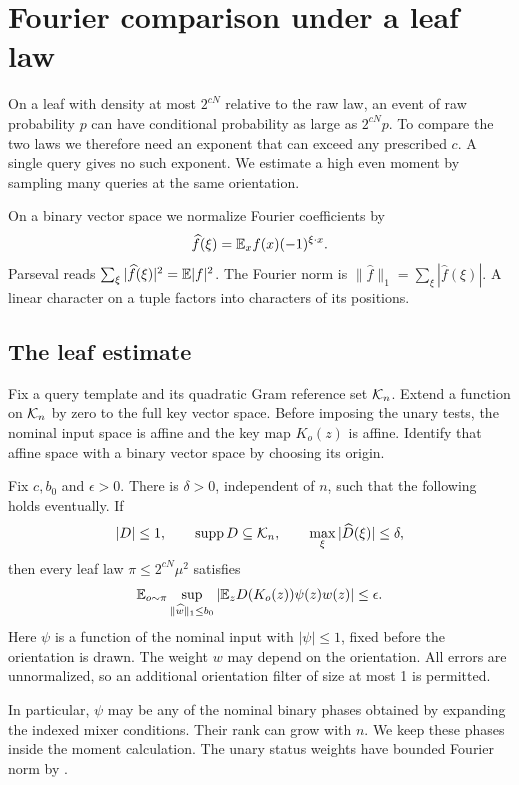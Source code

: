 \section{Fourier comparison under a leaf law}\label{sec:histograms}

On a leaf with density at most \(2^{cN}\) relative to the raw law,
an event of raw probability \(p\) can have conditional probability as
large as \(2^{cN}p\). To compare the two laws we therefore need an
exponent that can exceed any prescribed \(c\). A single query gives
no such exponent. We estimate a high even moment by sampling many
queries at the same orientation.

On a binary vector space we normalize Fourier coefficients by
\[
 \widehat f(\xi)=\mathbb E_x f(x)(-1)^{\xi\cdot x}.
\]
Parseval reads \(\sum_\xi|\widehat f(\xi)|^2=\mathbb E|f|^2\).
The Fourier norm is \(\|\widehat f\|_1=\sum_\xi|\widehat f(\xi)|\).
A linear character on a tuple factors into characters of its positions.

\subsection{The leaf estimate}

Fix a query template and its quadratic Gram reference set \(\mathcal K_n\).
Extend a function on \(\mathcal K_n\) by zero to the full key vector space.
Before imposing the unary tests, the nominal input space is affine and
the key map \(K_o(z)\) is affine. Identify that affine space with a binary
vector space by choosing its origin.

\begin{theorem}\label{thm:leaf-fourier}
Fix \(c,b_0\) and \(\epsilon>0\). There is \(\delta>0\), independent
of \(n\), such that the following holds eventually. If
\[
 |D|\le1,\qquad \operatorname{supp} D\subseteq\mathcal K_n,\qquad
 \max_\xi|\widehat D(\xi)|\le\delta,
\]
then every leaf law \(\pi\le2^{cN}\mu^2\) satisfies
\[
 \mathbb E_{o\sim\pi}\sup_{\|\widehat w\|_1\le b_0}
 \left|\mathbb E_zD(K_o(z))\psi(z)w(z)\right|\le\epsilon.
\]
Here \(\psi\) is a function of the nominal input with \(|\psi|\le1\), fixed before the orientation is drawn. The weight
\(w\) may depend on the orientation. All errors are unnormalized, so
an additional orientation filter of size at most 1 is permitted.
\end{theorem}

In particular, \(\psi\) may be any of the nominal binary phases obtained
by expanding the indexed mixer conditions. Their rank can grow with \(n\).
We keep these phases inside the moment calculation. The unary status
weights have bounded Fourier norm by
.

